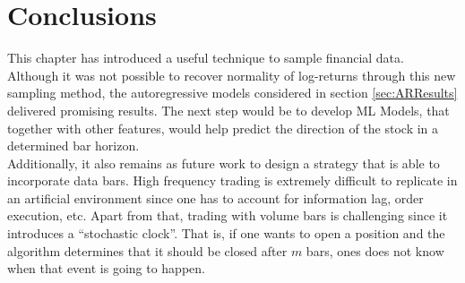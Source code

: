 \section{Conclusions}
This chapter has introduced a useful technique to sample financial data. 
Although it was not possible to recover normality of log-returns through 
this new sampling method, the autoregressive models considered in section 
\ref{sec:ARResults} delivered promising results. The next step would be to 
develop ML Models, that together with other features, would help predict the 
direction of the stock in a determined bar horizon.\\

Additionally, it also remains as future work to design a strategy that is 
able to incorporate data bars. High frequency trading is extremely difficult 
to replicate in an artificial environment since one has to account for 
information lag, order execution, etc. Apart from that, trading with volume 
bars is challenging since it introduces a ``stochastic clock''. That is, if 
one wants to  open a position and the algorithm determines that it should 
be closed after $m$ bars, ones does not know when that event is going to 
happen.